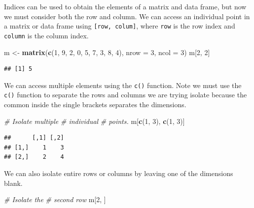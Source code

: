 \documentclass[
]{book}
\newenvironment{Shaded}{\begin{snugshade}}{\end{snugshade}}
\newcommand{\CommentTok}[1]{\textcolor[rgb]{0.56,0.35,0.01}{\textit{#1}}}
\newcommand{\DataTypeTok}[1]{\textcolor[rgb]{0.13,0.29,0.53}{#1}}
\newcommand{\DecValTok}[1]{\textcolor[rgb]{0.00,0.00,0.81}{#1}}
\newcommand{\KeywordTok}[1]{\textcolor[rgb]{0.13,0.29,0.53}{\textbf{#1}}}
\newcommand{\NormalTok}[1]{#1}
\newcommand{\StringTok}[1]{\textcolor[rgb]{0.31,0.60,0.02}{#1}}
\begin{document}
Indices can be used to obtain the elements of a matrix and data frame, but now we must consider both the row and column. We can access an individual point in a matrix or data frame using \texttt{{[}row,\ colum{]}}, where \texttt{row} is the row index and \texttt{column} is the column index.

\begin{Shaded}
\begin{Highlighting}[]
\NormalTok{m <-}\StringTok{ }\KeywordTok{matrix}\NormalTok{(}\KeywordTok{c}\NormalTok{(}\DecValTok{1}\NormalTok{, }\DecValTok{9}\NormalTok{, }\DecValTok{2}\NormalTok{,}
    \DecValTok{0}\NormalTok{, }\DecValTok{5}\NormalTok{, }\DecValTok{7}\NormalTok{, }\DecValTok{3}\NormalTok{, }\DecValTok{8}\NormalTok{, }\DecValTok{4}\NormalTok{),}
    \DataTypeTok{nrow =} \DecValTok{3}\NormalTok{, }\DataTypeTok{ncol =} \DecValTok{3}\NormalTok{)}
\NormalTok{m[}\DecValTok{2}\NormalTok{, }\DecValTok{2}\NormalTok{]}
\end{Highlighting}
\end{Shaded}

\begin{verbatim}
## [1] 5
\end{verbatim}

We can access multiple elements using the \texttt{c()} function. Note we must use the \texttt{c()} function to separate the rows and columns we are trying isolate because the common inside the single brackets separates the dimensions.

\begin{Shaded}
\begin{Highlighting}[]
\CommentTok{# Isolate multiple}
\CommentTok{# individual}
\CommentTok{# points.}
\NormalTok{m[}\KeywordTok{c}\NormalTok{(}\DecValTok{1}\NormalTok{, }\DecValTok{3}\NormalTok{), }\KeywordTok{c}\NormalTok{(}\DecValTok{1}\NormalTok{, }\DecValTok{3}\NormalTok{)]}
\end{Highlighting}
\end{Shaded}

\begin{verbatim}
##      [,1] [,2]
## [1,]    1    3
## [2,]    2    4
\end{verbatim}

We can also isolate entire rows or columns by leaving one of the dimensions blank.

\begin{Shaded}
\begin{Highlighting}[]
\CommentTok{# Isolate the}
\CommentTok{# second row}
\NormalTok{m[}\DecValTok{2}\NormalTok{, ]}
\end{Highlighting}
\end{Shaded}
\end{document}
